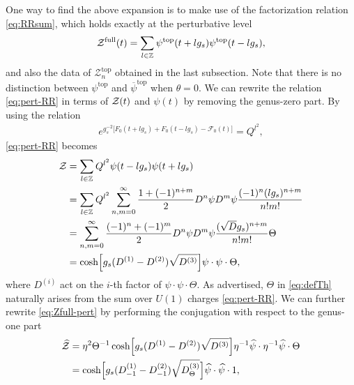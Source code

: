\documentclass[11pt]{article}
\def\th{\theta}
\def\b#1{\overline{#1}}
\def\h#1{\widehat{#1}}
\def\rt#1{\sqrt{#1}}
\newcommand{\Ztop}{\mathcal{Z}^{\text{top}}}
\renewcommand{\[}{\begin{eqnarray}}
\renewcommand{\]}{\end{eqnarray}}
\newcommand{\Zefull}{{\cal Z}^{\text{full}}}
\newcommand{\Zeven}{{\cal Z}}
\newcommand{\Thetaeven}{\Theta}
\begin{document}
One way to find the above expansion is to make use of the
factorization relation \eqref{eq:RRsum},
which holds exactly at the perturbative level
\begin{equation}
\begin{aligned}
 \Zefull(t)=\sum_{l\in\mathbb{Z}}\psi^{\text{top}}(t+lg_s)
\psi^{\text{top}}(t-lg_s),
\end{aligned} 
\label{eq:pert-RR}
\end{equation}
and also the data of $\Ztop_n$ obtained in the last subsection.
Note that there is no distinction between $\psi^{\text{top}}$ and
$\b{\psi}^{\text{top}}$ when $\th=0$.
We can rewrite the relation \eqref{eq:pert-RR}
in terms of $\Zeven(t)$ and $\psi(t)$
by removing the genus-zero part.
By using the relation
\begin{equation}
\begin{aligned}
 e^{g_s^{-2}\bigl[F_0(t+lg_s)+F_0(t-lg_s)-\mathcal{F}_0(t)\bigr]}=Q^{l^2},
\end{aligned} 
\end{equation}
\eqref{eq:pert-RR} becomes
\begin{align}
\begin{aligned}
 \Zeven&=\sum_{l\in\mathbb{Z}}Q^{l^2}\psi(t-lg_s)\psi(t+lg_s)\\
&=\sum_{l\in\mathbb{Z}}Q^{l^2} \sum_{n,m=0}^\infty \frac{1+(-1)^{n+m}}{2}
D^n\psi D^m\psi\frac{(-1)^n(lg_s)^{n+m}}{n!m!}\\
&=\sum_{n,m=0}^\infty \frac{(-1)^n+(-1)^{m}}{2}
D^n\psi D^m\psi\frac{(\rt{D}g_s)^{n+m}}{n!m!}\Thetaeven\\
&=\cosh \Bigl[g_s(D^{(1)}-D^{(2)})\rt{D^{(3)}}\Bigr]\psi\cdot \psi\cdot \Thetaeven,
\end{aligned}
\label{eq:Zfull-pert}
\end{align}
where $D^{(i)}$ act on the $i$-th factor of
$\psi\cdot \psi\cdot \Thetaeven$.
As advertised, $\Thetaeven$ in \eqref{eq:defTh}
naturally arises from the 
sum over $U(1)$ charges \eqref{eq:pert-RR}.
We can further rewrite \eqref{eq:Zfull-pert}  by
performing the conjugation
with respect to the genus-one part
\begin{equation}
\begin{aligned}
 \h{\mathcal{Z}}&= \eta^2 \Thetaeven^{-1}
\cosh \Bigl[g_s(D^{(1)}-D^{(2)})\rt{D^{(3)}}\Bigr]\eta^{-1}\h{\psi}\cdot \eta^{-1}\h{\psi}
\cdot \Thetaeven\\
&=\cosh \Bigl[g_s(D^{(1)}_{-1}-D^{(2)}_{-1})\rt{D^{(3)}_\Thetaeven}\Bigr]\h{\psi}\cdot \h{\psi}
\cdot 1,
\end{aligned} 
\end{equation}
\end{document}
